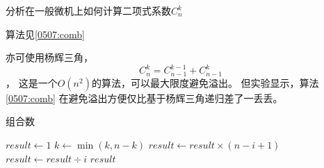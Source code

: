 \begin{questions}
\begin{parts}
\begin{solution}
        \end{solution}
    \end{parts}

    \question 分析在一般微机上如何计算二项式系数$C_n^k$
    \begin{solution}
    算法见\ref{0507:comb}

        亦可使用杨辉三角，$$C_{n}^{k}=C_{n-1}^{k-1}+C_{n-1}^{k}$$，
        这是一个$O(n^2)$的算法，可以最大限度避免溢出。
        但实验显示，算法 \ref{0507:comb} 在避免溢出方便仅比基于杨辉三角递归差了一丢丢。
    \end{solution}

    \begin{algorithm}[!htp]
        \caption{组合数}\label{0507:comb}
        \begin{algorithmic}[1]
            \State $result \gets 1$
            \State $k \gets \min(k, n-k)$
            \State $result \gets result \times (n-i+1)$
            \State $result \gets result \div i$
            \EndFor
            \State \Return $result$
        \end{algorithmic}
    \end{algorithm}

\end{questions}

